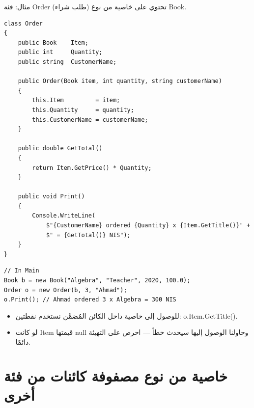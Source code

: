 \documentclass[14pt]{extarticle}
\begin{document}
\begin{boxNote}
مثال: فئة \textenglish{Order} (طلب شراء) تحتوي على خاصية من نوع \textenglish{Book}.
\end{boxNote}

{\small
\begin{boxExample}
\begin{english}
\begin{verbatim}
class Order
{
    public Book    Item;
    public int     Quantity;
    public string  CustomerName;

    public Order(Book item, int quantity, string customerName)
    {
        this.Item         = item;
        this.Quantity     = quantity;
        this.CustomerName = customerName;
    }

    public double GetTotal()
    {
        return Item.GetPrice() * Quantity;
    }

    public void Print()
    {
        Console.WriteLine(
            $"{CustomerName} ordered {Quantity} x {Item.GetTitle()}" +
            $" = {GetTotal()} NIS");
    }
}
\end{verbatim}
\end{english}
\end{boxExample}


\begin{boxExample}
\begin{english}
\begin{verbatim}
// In Main
Book b = new Book("Algebra", "Teacher", 2020, 100.0);
Order o = new Order(b, 3, "Ahmad");
o.Print(); // Ahmad ordered 3 x Algebra = 300 NIS
\end{verbatim}
\end{english}
\end{boxExample}
}

\begin{itemize}[itemsep=1pt]
    \item للوصول إلى خاصية داخل الكائن المُضمَّن نستخدم نقطتين: \textenglish{o.Item.GetTitle()}.
    \item لو كانت \textenglish{Item} قيمتها \textenglish{null} وحاولنا الوصول إليها سيحدث خطأ — احرص على التهيئة دائمًا.
\end{itemize}

\clearpage
\section{خاصية من نوع مصفوفة كائنات من فئة أخرى}
\end{document}
